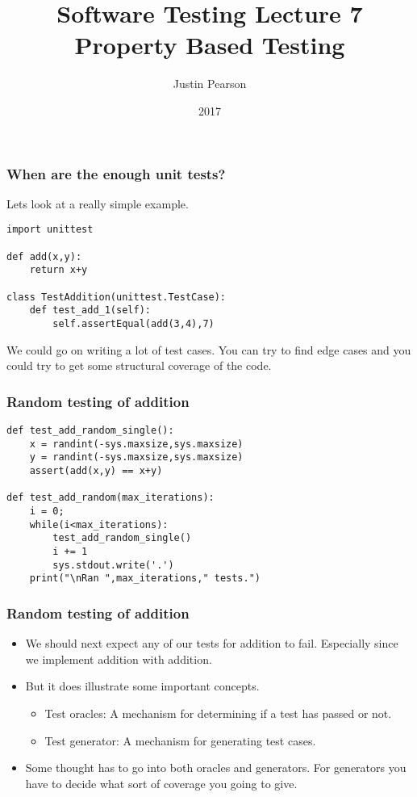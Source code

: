 \documentclass{beamer}
\title{Software Testing  Lecture 7 \\ Property Based Testing}
\author{Justin Pearson}
\date{2017}
\begin{document}
\lstset{language=Python}

\begin{frame}
  \maketitle
\end{frame}

\begin{frame}[fragile]
  \frametitle{When are the enough unit tests?}
  Lets look at a really simple example.
  \begin{lstlisting}
import unittest

def add(x,y):
    return x+y

class TestAddition(unittest.TestCase):
    def test_add_1(self):
        self.assertEqual(add(3,4),7)

      \end{lstlisting}
We could go on writing a lot of test cases. You can try to find edge cases and
you could try to get some structural coverage of the code. 
\end{frame}
\begin{frame}[fragile]
  \frametitle{Random testing of addition}
  \begin{lstlisting}
def test_add_random_single():
    x = randint(-sys.maxsize,sys.maxsize)
    y = randint(-sys.maxsize,sys.maxsize)
    assert(add(x,y) == x+y)

def test_add_random(max_iterations):
    i = 0;
    while(i<max_iterations):
        test_add_random_single()
        i += 1
        sys.stdout.write('.')
    print("\nRan ",max_iterations," tests.")
  \end{lstlisting}
\end{frame}
\begin{frame}
  \frametitle{Random testing of addition}
  \begin{itemize}
  \item We should next expect any of our tests for addition to
    fail. Especially since we implement addition with addition.
  \item But it does illustrate some important concepts.
    \begin{itemize}
    \item Test oracles: A mechanism for determining if a test has passed or
      not.
    \item Test generator: A mechanism for generating test cases. 
      
    \end{itemize}
  \item Some thought has to go into both oracles and generators. For
    generators you have to decide what sort of coverage you going to give.
  \end{itemize}
  
\end{frame}
\end{document}
